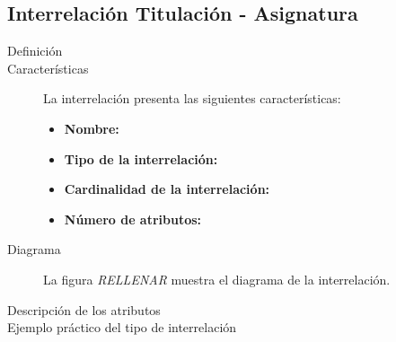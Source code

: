 \subsection{Interrelación Titulación - Asignatura}

   \begin{description}
      \item[Definición]

      \item[Características] La interrelación presenta las siguientes
                             características:

         \begin{itemize}
            \item \textbf{Nombre:}
            \item \textbf{Tipo de la interrelación:}
            \item \textbf{Cardinalidad de la interrelación:}
            \item \textbf{Número de atributos:}
         \end{itemize}

      \item[Diagrama] La figura \textit{RELLENAR} muestra el diagrama de la
                      interrelación.

      \item[Descripción de los atributos]

      \item[Ejemplo práctico del tipo de interrelación]
   \end{description}
